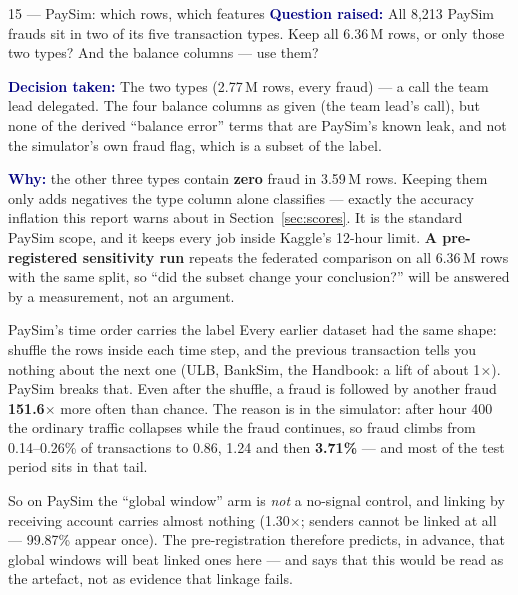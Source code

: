 \documentclass[11pt]{article}
\newcommand{\qlabel}[1]{\textbf{\textcolor{navy}{#1}}\;}
\begin{document}
\begin{decision}{15 --- PaySim: which rows, which features}
\qlabel{Question raised:} All 8{,}213 PaySim frauds sit in two of its five transaction types. Keep all
6.36\,M rows, or only those two types? And the balance columns --- use them?

\qlabel{Decision taken:} The two types (2.77\,M rows, every fraud) --- a call the team lead delegated. The
four balance columns as given (the team lead's call), but none of the derived ``balance error'' terms
that are PaySim's known leak, and not the simulator's own fraud flag, which is a subset of the label.

\qlabel{Why:} the other three types contain \textbf{zero} fraud in 3.59\,M rows. Keeping them only adds
negatives the type column alone classifies --- exactly the accuracy inflation this report warns about in
Section~\ref{sec:scores}. It is the standard PaySim scope, and it keeps every job inside Kaggle's 12-hour
limit. \textbf{A pre-registered sensitivity run} repeats the federated comparison on all 6.36\,M rows with
the same split, so ``did the subset change your conclusion?'' will be answered by a measurement, not an
argument.
\end{decision}

\begin{warnbox}{PaySim's time order carries the label}
Every earlier dataset had the same shape: shuffle the rows inside each time step, and the previous
transaction tells you nothing about the next one (ULB, BankSim, the Handbook: a lift of about
1$\times$). PaySim breaks that. Even after the shuffle, a fraud is followed by another fraud
\textbf{151.6$\times$} more often than chance. The reason is in the simulator: after hour 400 the ordinary
traffic collapses while the fraud continues, so fraud climbs from 0.14--0.26\% of transactions to 0.86,
1.24 and then \textbf{3.71\%} --- and most of the test period sits in that tail.

So on PaySim the ``global window'' arm is \emph{not} a no-signal control, and linking by receiving account
carries almost nothing (1.30$\times$; senders cannot be linked at all --- 99.87\% appear once). The
pre-registration therefore predicts, in advance, that global windows will beat linked ones here --- and
says that this would be read as the artefact, not as evidence that linkage fails.
\end{warnbox}
\end{document}
